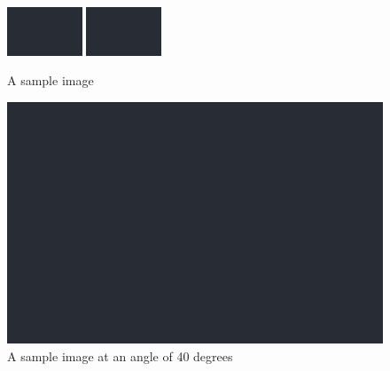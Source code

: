 \documentclass{book}
\begin{document}
\begin{figure}[!htbp]
	\includegraphics[width=0.2\textwidth]{image.png} \hfill
	\includegraphics[width=0.2\textwidth]{image.png}
	\caption{A sample image}
	\label{fig:image}
\end{figure}
\begin{figure}[!htbp]
	\centering
	\includegraphics[angle=40, width=0.5\linewidth,height=0.5\linewidth]{image.png}
	\caption{A sample image at an angle of 40 degrees}
\end{figure}
\newpage
\end{document}
